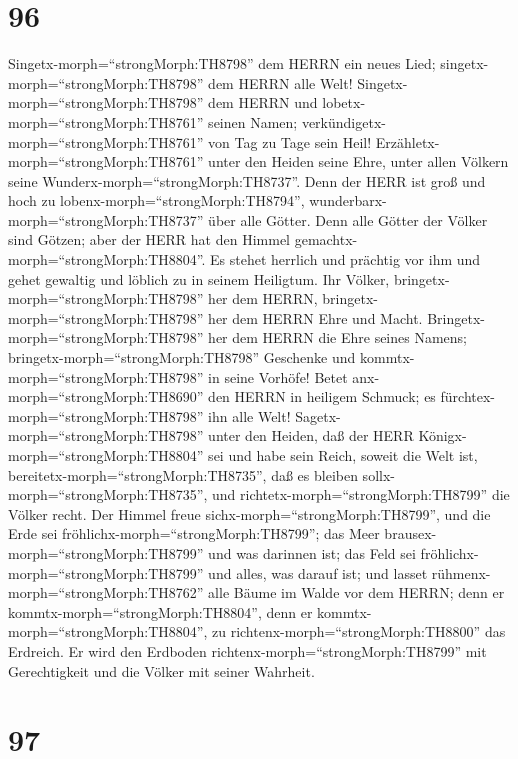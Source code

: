\hypertarget{section-95}{%
\section{96}\label{section-95}}

 Singetx-morph=``strongMorph:TH8798'' dem HERRN ein neues
Lied; singetx-morph=``strongMorph:TH8798'' dem HERRN alle Welt!
 Singetx-morph=``strongMorph:TH8798'' dem HERRN und
lobetx-morph=``strongMorph:TH8761'' seinen Namen;
verkündigetx-morph=``strongMorph:TH8761'' von Tag zu Tage sein Heil!
 Erzähletx-morph=``strongMorph:TH8761'' unter den Heiden
seine Ehre, unter allen Völkern seine
Wunderx-morph=``strongMorph:TH8737''.  Denn der HERR ist
groß und hoch zu lobenx-morph=``strongMorph:TH8794'',
wunderbarx-morph=``strongMorph:TH8737'' über alle Götter. 
Denn alle Götter der Völker sind Götzen; aber der HERR hat den Himmel
gemachtx-morph=``strongMorph:TH8804''.  Es stehet herrlich
und prächtig vor ihm und gehet gewaltig und löblich zu in seinem
Heiligtum.  Ihr Völker,
bringetx-morph=``strongMorph:TH8798'' her dem HERRN,
bringetx-morph=``strongMorph:TH8798'' her dem HERRN Ehre und Macht.
 Bringetx-morph=``strongMorph:TH8798'' her dem HERRN die
Ehre seines Namens; bringetx-morph=``strongMorph:TH8798'' Geschenke und
kommtx-morph=``strongMorph:TH8798'' in seine Vorhöfe!  Betet
anx-morph=``strongMorph:TH8690'' den HERRN in heiligem Schmuck; es
fürchtex-morph=``strongMorph:TH8798'' ihn alle Welt! 
Sagetx-morph=``strongMorph:TH8798'' unter den Heiden, daß der HERR
Königx-morph=``strongMorph:TH8804'' sei und habe sein Reich, soweit die
Welt ist, bereitetx-morph=``strongMorph:TH8735'', daß es bleiben
sollx-morph=``strongMorph:TH8735'', und
richtetx-morph=``strongMorph:TH8799'' die Völker recht. 
Der Himmel freue sichx-morph=``strongMorph:TH8799'', und die Erde sei
fröhlichx-morph=``strongMorph:TH8799''; das Meer
brausex-morph=``strongMorph:TH8799'' und was darinnen ist; 
das Feld sei fröhlichx-morph=``strongMorph:TH8799'' und alles, was
darauf ist; und lasset rühmenx-morph=``strongMorph:TH8762'' alle Bäume
im Walde  vor dem HERRN; denn er
kommtx-morph=``strongMorph:TH8804'', denn er
kommtx-morph=``strongMorph:TH8804'', zu
richtenx-morph=``strongMorph:TH8800'' das Erdreich. Er wird den Erdboden
richtenx-morph=``strongMorph:TH8799'' mit Gerechtigkeit und die Völker
mit seiner Wahrheit.

\hypertarget{section-96}{%
\section{97}\label{section-96}}

